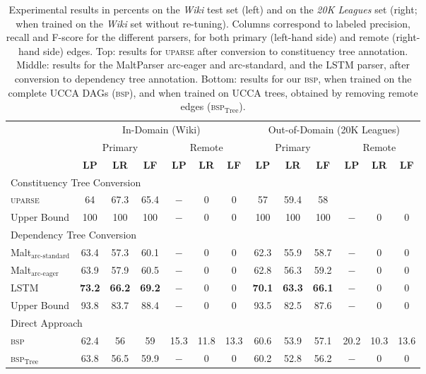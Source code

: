 \documentclass[12pt]{article}
\begin{document}
\begin{table}[ht!]\small
  \centering
\begin{tabular}{l|ccc|ccc||ccc|ccc}
& \multicolumn{6}{c||}{In-Domain (Wiki)} & \multicolumn{6}{c}{Out-of-Domain (20K Leagues)} \\
& \multicolumn{3}{c|}{Primary} & \multicolumn{3}{c}{Remote}
& \multicolumn{3}{c|}{Primary} & \multicolumn{3}{c}{Remote} \\
& \textbf{LP} & \textbf{LR} & \textbf{LF} & \textbf{LP} & \textbf{LR} & \textbf{LF}
& \textbf{LP} & \textbf{LR} & \textbf{LF} & \textbf{LP} & \textbf{LR} & \textbf{LF} \\
\hline
\multicolumn{4}{l}{\rule{0pt}{2ex} \footnotesize Constituency Tree Conversion} \\
\textsc{uparse} & 64 & 67.3 & 65.4 & $-$ & 0 & 0 & 57 & 59.4 & 58 \\
Upper Bound & 100 & 100 & 100 & $-$ & 0 & 0 & 100 & 100 & 100 & $-$ & 0 & 0 \\
\hline
\multicolumn{4}{l}{\rule{0pt}{4ex} \footnotesize Dependency Tree Conversion} \\
Malt$_{\textrm{arc-standard}}$ & 63.4 & 57.3 & 60.1 & $-$ & 0 & 0 & 62.3 & 55.9 & 58.7 & $-$ & 0 & 0 \\
Malt$_{\textrm{arc-eager}}$ & 63.9 & 57.9 & 60.5 & $-$ & 0 & 0 & 62.8 & 56.3 & 59.2 & $-$ & 0 & 0 \\
LSTM & {\bf 73.2} & {\bf 66.2} & {\bf 69.2} & $-$ & 0 & 0 & {\bf 70.1} & {\bf 63.3} & {\bf 66.1} & $-$ & 0 & 0 \\
Upper Bound & 93.8 & 83.7 & 88.4 & $-$ & 0 & 0 & 93.5 & 82.5 & 87.6 & $-$ & 0 & 0 \\
\hline
\multicolumn{4}{l}{\rule{0pt}{4ex} \footnotesize Direct Approach} \\
\textsc{bsp} & 62.4 & 56 & 59 & 15.3 & 11.8 & 13.3 & 60.6 & 53.9 & 57.1 & 20.2 & 10.3 & 13.6 \\
\textsc{bsp}$_{\mathrm{Tree}}$ & 63.8 & 56.5 & 59.9 & $-$ & 0 & 0 & 60.2 & 52.8 & 56.2 & $-$ & 0 & 0 \\
\end{tabular}
\caption{
  Experimental results in percents on the \textit{Wiki} test set (left) and
  on the \textit{20K Leagues} set (right; when trained on the \textit{Wiki} set without re-tuning).
  Columns correspond to labeled precision,
  recall and F-score for the different parsers, for both primary (left-hand side)
  and remote (right-hand side) edges. Top: results for \textsc{uparse}
  after conversion to constituency tree annotation. Middle: results for the
  MaltParser arc-eager and arc-standard, and
  the LSTM parser, after conversion to dependency tree annotation.
  Bottom: results for our \textsc{bsp}, when trained on the complete UCCA DAGs (\textsc{bsp}),
  and when trained on UCCA trees, obtained by removing remote edges (\textsc{bsp}$_{\mathrm{Tree}}$).
}
\label{table:results}
\end{table}
\end{document}
